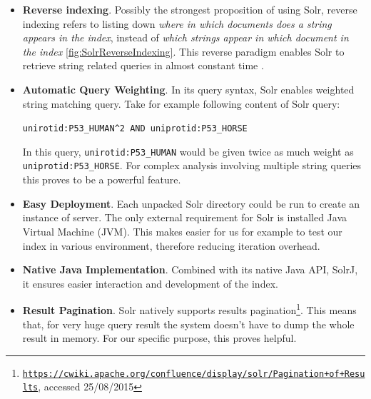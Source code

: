 \begin{itemize}
\item \textbf{Reverse indexing}. Possibly the strongest proposition of using Solr, reverse indexing refers to listing down \textit{where in which documents does a string appears in the index}, instead of \textit{which strings appear in which document in the index} \ref{fig:SolrReverseIndexing}. This reverse paradigm enables Solr to retrieve string related queries in almost constant time \citep{grainger2014solr}.
\item \textbf{Automatic Query Weighting}. In its query syntax, Solr enables weighted string matching query. Take for example following content of Solr query: 
\begin{center}
\texttt{unirotid:P53\_HUMAN\textasciicircum2 AND uniprotid:P53\_HORSE}
\end{center}
In this query, \texttt{unirotid:P53\_HUMAN} would be given twice as much weight as \texttt{uniprotid:P53\_HORSE}. For complex analysis involving multiple string queries this proves to be a powerful feature.
\item \textbf{Easy Deployment}. Each unpacked Solr directory could be run to create an instance of server. The only external requirement for Solr is installed Java Virtual Machine (JVM). This makes easier for us for example to test our index in various environment, therefore reducing iteration overhead.
\item \textbf{Native Java Implementation}. Combined with its native Java API, SolrJ, it ensures easier interaction and development of the index.
\item \textbf{Result Pagination}. Solr natively supports results pagination\footnote{\href{https://cwiki.apache.org/confluence/display/solr/Pagination+of+Results}{\texttt{https://cwiki.apache.org/confluence/display/solr/Pagination+of+Results}}, accessed 25/08/2015}. This means that, for very huge query result the system doesn't have to dump the whole result in memory. For our specific purpose, this proves helpful.
\end{itemize}

